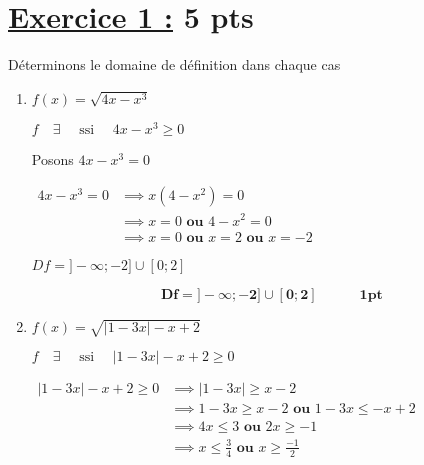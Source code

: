 \documentclass[12pt,a4paper]{article}
\begin{document}
\section*{\underline{Exercice 1 :} 5 pts }
Déterminons le domaine de définition dans chaque cas
\begin{enumerate}
    \item $f(x) = \sqrt{4x - x^3}$

\( f\quad \exists\quad  \text{ ssi } \quad 4x - x^3 \geq 0 \)

Posons \( 4x - x^3 = 0 \)

\(
\begin{aligned}
4x - x^3 = 0 &\implies x(4 - x^2) = 0\\
						 &\implies x = 0 \textbf{ ou } 4 - x^2 = 0\\
 						 &\implies	x = 0 \textbf{ ou } x = 2 \textbf{ ou } x = -2
\end{aligned}
\)  

\begin{center}
\end{center}    

\begin{center}
\( Df = ]-\infty;-2] \cup [0 ; 2 ] \) 
\end{center}   

          \begin{resultbox}
            \[
                \mathbf{Df = ]-\infty;-2] \cup [0 ; 2 ]\quad\quad\quad \textbf{1pt}}
            \]
        \end{resultbox}     
    
    \item $f(x) = \sqrt{|1 - 3x| - x + 2}$
    
    \( f\quad \exists\quad  \text{ ssi } \quad |1 - 3x| - x + 2 \geq 0 \)

\(
\begin{aligned}
|1 - 3x| - x + 2 \geq 0 &\implies |1 - 3x| \geq  x - 2\\
						 &\implies 1 - 3x \geq  x - 2 \textbf{ ou } 1 - 3x \leq  -x + 2\\
 						 &\implies	4x \leq 3 \textbf{ ou }  2x \geq  -1\\
 						 &\implies	x \leq \frac{3}{4} \textbf{ ou }  x \geq \frac{-1}{2}\\
\end{aligned}
\)  


\end{enumerate}
\end{document}
